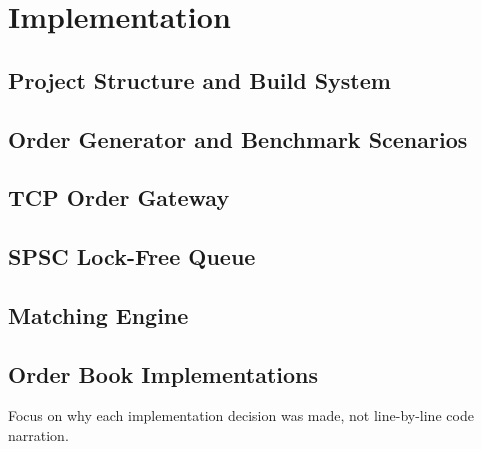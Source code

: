 \chapter{Implementation}

\section{Project Structure and Build System}
\section{Order Generator and Benchmark Scenarios}
\section{TCP Order Gateway}
\section{SPSC Lock-Free Queue}
\section{Matching Engine}
\section{Order Book Implementations}

Focus on why each implementation decision was made, not line-by-line code narration.
